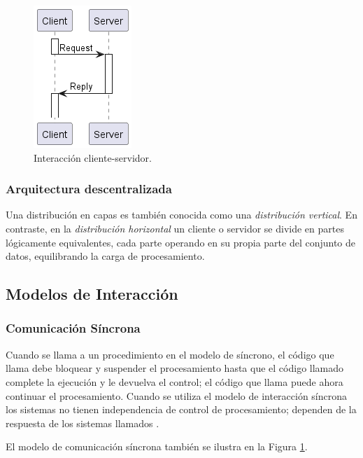 \documentclass[conference,compsoc]{IEEEtran}
\begin{document}
\begin{figure}[htb]
    \centering
    \includegraphics[width=0.35\columnwidth]{client-server.png}
    \caption{Interacción cliente-servidor.}
    \label{fig:client_server}
\end{figure}

\subsubsection{Arquitectura descentralizada}

Una distribución en capas es también conocida como una \emph{distribución vertical}. En contraste, en la \emph{distribución horizontal} un cliente o servidor se divide en partes lógicamente equivalentes, cada parte operando en su propia parte del conjunto de datos, equilibrando la carga de procesamiento\cite{steen_tanenbaum_2017}.

\subsection{Modelos de Interacción}

\subsubsection{Comunicación Síncrona}

Cuando se llama a un procedimiento en el modelo de síncrono, el código que llama debe bloquear y suspender el procesamiento hasta que el código llamado complete la ejecución y le devuelva el control; el código que llama puede ahora continuar el procesamiento. Cuando se utiliza el modelo de interacción síncrona los sistemas no tienen independencia de control de procesamiento; dependen de la respuesta de los sistemas llamados \cite{curry_2004}.

El modelo de comunicación síncrona también se ilustra en la Figura \ref{fig:client_server}.
\end{document}
